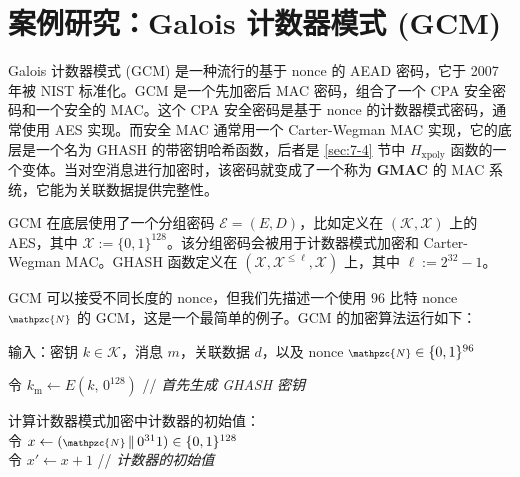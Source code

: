 \section{案例研究：Galois 计数器模式 (GCM)}\label{sec:9-7}


Galois 计数器模式 (GCM) 是一种流行的基于 nonce 的 AEAD 密码，它于 2007 年被 NIST 标准化。GCM 是一个先加密后 MAC 密码，组合了一个 CPA 安全密码和一个安全的 MAC。这个 CPA 安全密码是基于 nonce 的计数器模式密码，通常使用 AES 实现。而安全 MAC 通常用一个 Carter-Wegman MAC 实现，它的底层是一个名为 GHASH 的带密钥哈希函数，后者是 \ref{sec:7-4} 节中 $H_\mathrm{xpoly}$ 函数的一个变体。当对空消息进行加密时，该密码就变成了一个称为 \textbf{GMAC} 的 MAC 系统，它能为关联数据提供完整性。

GCM 在底层使用了一个分组密码 $\mathcal{E}=(E,D)$，比如定义在 $(\mathcal{K},\mathcal{X})$ 上的 AES，其中 $\mathcal{X}:=\{0,1\}^{128}$。该分组密码会被用于计数器模式加密和 Carter-Wegman MAC。GHASH 函数定义在 $(\mathcal{X},\mathcal{X}^{\leq\ell},\mathcal{X})$ 上，其中 $\ell:=2^{32}-1$。

GCM 可以接受不同长度的 nonce，但我们先描述一个使用 $96$ 比特 nonce ${\scriptstyle\mathpzc{N}}$ 的 GCM，这是一个最简单的例子。GCM 的加密算法运行如下：

\vspace*{10pt}

\hspace*{5pt} 输入：密钥 $k\in\mathcal{K}$，消息 $m$，关联数据 $d$，以及 nonce ${\scriptstyle\mathpzc{N}}\in\{0,1\}^{96}$

\vspace*{5pt}

\hspace*{5pt} 令 $k_\mathrm{m}\leftarrow E(k,\,0^{128})$
\hspace*{150pt} // \quad \emph{首先生成 GHASH 密钥}

\vspace*{5pt}

\hspace*{5pt} 计算计数器模式加密中计数器的初始值：\\
\hspace*{50pt} 令 $x\leftarrow({\scriptstyle\mathpzc{N}}\,\Vert\,0^{31}1)\in\{0,1\}^{128}$\\
\hspace*{50pt} 令 $x'\leftarrow x+1$
\hspace*{152pt} // \quad \emph{计数器的初始值}

\vspace*{5pt}

